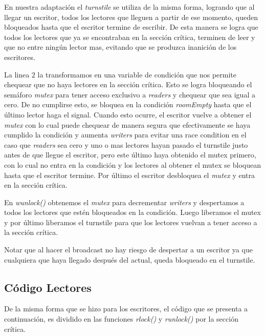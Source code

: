 \documentclass[a4paper,11pt]{article}
\begin{document}

En nuestra adaptación el \emph{turnstile} se utiliza de la misma forma, logrando que al llegar un escritor, todos los lectores que lleguen a partir de ese momento, queden bloqueados hasta que el escritor termine de escribir. De esta manera se logra que todos los lectores que ya se encontraban en la sección crítica, terminen de leer y que no entre ningún lector mas, evitando que se produzca inanición de los escritores.

La linea $2$ la transformamos en una variable de condición que nos permite chequear que no haya lectores en la sección crítica. Esto se logra bloqueando el semáforo \emph{mutex} para tener acceso exclusivo a \emph{readers} y chequear que sea igual a cero. De no cumplirse esto, se bloquea en la condición \emph{roomEmpty} hasta que el último lector haga el signal. Cuando esto ocurre, el escritor vuelve a obtener el \emph{mutex} con lo cual puede chequear de manera segura que efectivamente se haya cumplido la condición y aumenta \emph{writers} para evitar una race condition en el caso que \emph{readers} sea cero y uno o mas lectores hayan pasado el turnstile justo antes de que llegue el escritor, pero este último haya obtenido el mutex primero, con lo cual no entra en la condición y los lectores al obtener el mutex se bloquean hasta que el escritor termine. Por último el escritor desbloquea el \emph{mutex} y entra en la sección crítica.

En \emph{wunlock()} obtenemos el \emph{mutex} para decrementar \emph{writers} y despertamos a todos los lectores que estén bloqueados en la condición. Luego liberamos el mutex y por último liberamos el turnstile para que los lectores vuelvan a tener acceso a la sección crítica.

Notar que al hacer el broadcast no hay riesgo de despertar a un escritor ya que cualquiera que haya llegado después del actual, queda bloqueado en el turnstile. 


\subsection{Código Lectores}
De la misma forma que se hizo para los escritores, el código que se presenta a continuación, es dividido en las funciones \emph{rlock()} y \emph{runlock()} por la sección crítica.
\end{document}
